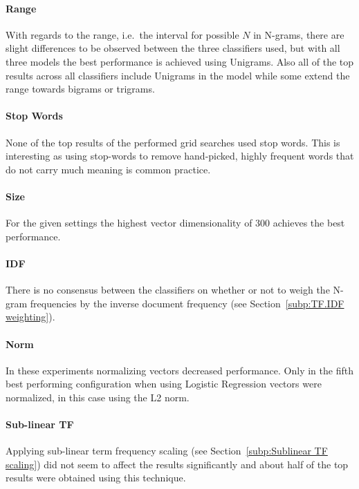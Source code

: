 \paragraph{Range}
\label{par:Range}
With regards to the range, i.e.\ the interval for possible $N$ in N-grams, there are slight differences to be observed between the three classifiers used, but with all three models the best performance is achieved using Unigrams. Also all of the top results across all classifiers include Unigrams in the model while some extend the range towards bigrams or trigrams.

\paragraph{Stop Words}
\label{par:Stop Words}
None of the top results of the performed grid searches used stop words. This is interesting as using stop-words to remove hand-picked, highly frequent words that do not carry much meaning is common practice.

\paragraph{Size}
\label{par:Size}
For the given settings the highest vector dimensionality of 300 achieves the best performance.

\paragraph{IDF}
\label{par:IDF}
There is no consensus between the classifiers on whether or not to weigh the N-gram frequencies by the inverse document frequency (see Section~\ref{subp:TF.IDF weighting}).

\paragraph{Norm}
\label{par:Norm}
In these experiments normalizing vectors decreased performance.
Only in the fifth best performing configuration when using Logistic Regression vectors were normalized, in this case using the L2 norm.

\paragraph{Sub-linear TF}
\label{par:Sub-linear TF}
Applying sub-linear term frequency scaling (see Section~\ref{subp:Sublinear TF scaling}) did not seem to affect the results significantly and about half of the top results were obtained using this technique.
\bigskip

